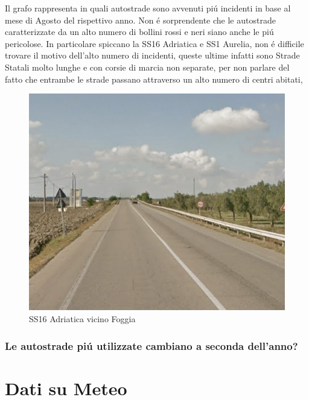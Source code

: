 \documentclass[a4paper]{report}
\begin{document}
Il grafo rappresenta in quali autostrade sono avvenuti pi\'u incidenti in base al mese di Agosto
del rispettivo anno.
Non \'e sorprendente che le autostrade caratterizzate da un alto numero di bollini rossi e neri 
siano anche le pi\'u pericolose.
In particolare spiccano la SS16 Adriatica e SS1 Aurelia, non \'e difficile trovare il motivo dell'alto numero di incidenti, 
queste ultime infatti sono Strade Statali molto lunghe e con corsie di marcia non separate, 
per non parlare del fatto che entrambe le strade passano attraverso un alto numero di centri abitati, 

\begin{figure}[!ht]
    \includegraphics[width=\linewidth]{../src/incidenti/incidenti_aci/agosto/adriatica.png}
    \caption{SS16 Adriatica vicino Foggia}
    \label{fig:adriatica}
\end{figure}

\newpage
\subsection{Le autostrade pi\'u utilizzate cambiano a seconda dell'anno?}



\newpage
\chapter{Dati su Meteo}



\end{document}
